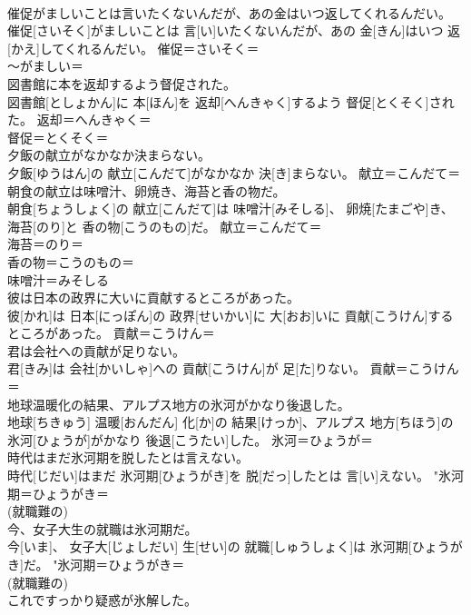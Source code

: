 \documentclass[8pt]{extreport}
\begin{document}
\begin{CJK}{UTF8}{min}
{\\	催促がましいことは言いたくないんだが、あの金はいつ返してくれるんだい。	
\\	催促[さいそく]がましいことは 言[い]いたくないんだが、あの 金[きん]はいつ 返[かえ]してくれるんだい。	催促＝さいそく＝ 
\\	〜がましい＝ 
\\	図書館に本を返却するよう督促された。	
\\	図書館[としょかん]に 本[ほん]を 返却[へんきゃく]するよう 督促[とくそく]された。	返却＝へんきゃく＝ 
\\	督促＝とくそく＝ 
\\	夕飯の献立がなかなか決まらない。	
\\	夕飯[ゆうはん]の 献立[こんだて]がなかなか 決[き]まらない。	献立＝こんだて＝ 
\\	朝食の献立は味噌汁、卵焼き、海苔と香の物だ。	
\\	朝食[ちょうしょく]の 献立[こんだて]は 味噌汁[みそしる]、 卵焼[たまごや]き、 海苔[のり]と 香の物[こうのもの]だ。	献立＝こんだて＝ 
\\	海苔＝のり＝ 
\\	香の物＝こうのもの＝ 
\\	味噌汁＝みそしる
\\	彼は日本の政界に大いに貢献するところがあった。	
\\	彼[かれ]は 日本[にっぽん]の 政界[せいかい]に 大[おお]いに 貢献[こうけん]するところがあった。	貢献＝こうけん＝ 
\\	君は会社への貢献が足りない。	
\\	君[きみ]は 会社[かいしゃ]への 貢献[こうけん]が 足[た]りない。	貢献＝こうけん＝ 
\\	地球温暖化の結果、アルプス地方の氷河がかなり後退した。	
\\	地球[ちきゅう] 温暖[おんだん] 化[か]の 結果[けっか]、アルプス 地方[ちほう]の 氷河[ひょうが]がかなり 後退[こうたい]した。	氷河＝ひょうが＝ 
\\	時代はまだ氷河期を脱したとは言えない。	
\\	時代[じだい]はまだ 氷河期[ひょうがき]を 脱[だっ]したとは 言[い]えない。	"氷河期＝ひょうがき＝ 
\\	(就職難の) 
\\	今、女子大生の就職は氷河期だ。	
\\	今[いま]、 女子大[じょしだい] 生[せい]の 就職[しゅうしょく]は 氷河期[ひょうがき]だ。	"氷河期＝ひょうがき＝ 
\\	(就職難の) 
\\	これですっかり疑惑が氷解した。	
}
\end{CJK}
\end{document}

